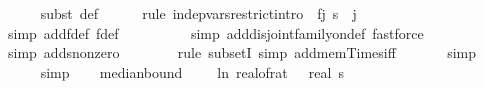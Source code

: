 \begin{isabellebody}
\ \ \ \ \isamarkupfalse%
\ {\isacharparenleft}{\kern0pt}subst\ {\isasymOmega}def{\isacharparenright}{\kern0pt}\isanewline
\ \ \ \ \isamarkupfalse%
\ {\isacharparenleft}{\kern0pt}rule\ indep{\isacharunderscore}{\kern0pt}vars{\isacharunderscore}{\kern0pt}restrict{\isacharunderscore}{\kern0pt}intro\ {\isacharbrackleft}{\kern0pt}\ f{\isacharequal}{\kern0pt}{\isachardoublequoteopen}{\isasymlambda}j{\isachardot}{\kern0pt}\ {\isacharbraceleft}{\kern0pt}{}{\isachardot}{\kern0pt}{\isachardot}{\kern0pt}{\isacharless}{\kern0pt}s\ {\isasymtimes}\ {\isacharbraceleft}{\kern0pt}j{\isacharbraceright}{\kern0pt}{\isachardoublequoteclose}{\isacharbrackright}{\kern0pt}{\isacharparenright}{\kern0pt}\isanewline
\ \ \ \ \ \ \ \ \ \isamarkupfalse%
\ {\isacharparenleft}{\kern0pt}simp\ add{\isacharcolon}{\kern0pt}f{}{\isacharunderscore}{\kern0pt}def\ f{}{\isacharunderscore}{\kern0pt}def{\isacharparenright}{\kern0pt}\isanewline
\ \ \ \ \ \ \ \ \isamarkupfalse%
\ {\isacharparenleft}{\kern0pt}simp\ add{\isacharcolon}{\kern0pt}disjoint{\isacharunderscore}{\kern0pt}family{\isacharunderscore}{\kern0pt}on{\isacharunderscore}{\kern0pt}def{\isacharcomma}{\kern0pt}\ fastforce{\isacharparenright}{\kern0pt}\isanewline
\ \ \ \ \ \ \ \isamarkupfalse%
\ {\isacharparenleft}{\kern0pt}simp\ add{\isacharcolon}{\kern0pt}s{}{\isacharunderscore}{\kern0pt}nonzero{\isacharparenright}{\kern0pt}\isanewline
\ \ \ \ \ \ \isamarkupfalse%
\ {\isacharparenleft}{\kern0pt}rule\ subsetI{\isacharcomma}{\kern0pt}\ simp\ add{\isacharcolon}{\kern0pt}mem{\isacharunderscore}{\kern0pt}Times{\isacharunderscore}{\kern0pt}iff{\isacharparenright}{\kern0pt}\isanewline
\ \ \ \ \ \isamarkupfalse%
\ simp\isanewline
\ \ \ \ \isamarkupfalse%
\ simp\isanewline
\isanewline
\ \ \isamarkupfalse%
\ median{\isacharunderscore}{\kern0pt}bound{\isacharunderscore}{\kern0pt}{}{\isacharcolon}{\kern0pt}\ {\isachardoublequoteopen}\ {\isacharminus}{\kern0pt}\ {\isacharparenleft}{\kern0pt}{}{}\ {\isacharasterisk}{\kern0pt}\ ln\ {\isacharparenleft}{\kern0pt}real{\isacharunderscore}{\kern0pt}of{\isacharunderscore}{\kern0pt}rat\ {\isasymepsilon}{\isacharparenright}{\kern0pt}{\isacharparenright}{\kern0pt}\ {\isasymle}\ real\ s\isanewline

\end{isabellebody}
